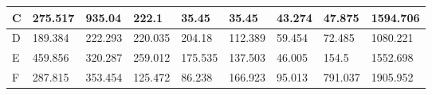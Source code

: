 \begin{landscape}
\begin{longtable}[c]{|l|llllllll|}
    C                                                                               & \multicolumn{1}{l|}{275.517}                                                        & \multicolumn{1}{l|}{935.04}                                                         & \multicolumn{1}{l|}{222.1}                                                          & \multicolumn{1}{l|}{35.45}                                                          & \multicolumn{1}{l|}{35.45}                                     & \multicolumn{1}{l|}{43.274}                                    & \multicolumn{1}{l|}{47.875}                                        & 1594.706                                                                               \\ \hline
    D                                                                               & \multicolumn{1}{l|}{189.384}                                                        & \multicolumn{1}{l|}{222.293}                                                        & \multicolumn{1}{l|}{220.035}                                                        & \multicolumn{1}{l|}{204.18}                                                         & \multicolumn{1}{l|}{112.389}                                   & \multicolumn{1}{l|}{59.454}                                    & \multicolumn{1}{l|}{72.485}                                        & 1080.221                                                                               \\ \hline
    E                                                                               & \multicolumn{1}{l|}{459.856}                                                        & \multicolumn{1}{l|}{320.287}                                                        & \multicolumn{1}{l|}{259.012}                                                        & \multicolumn{1}{l|}{175.535}                                                        & \multicolumn{1}{l|}{137.503}                                   & \multicolumn{1}{l|}{46.005}                                    & \multicolumn{1}{l|}{154.5}                                         & 1552.698                                                                               \\ \hline
    F                                                                               & \multicolumn{1}{l|}{287.815}                                                        & \multicolumn{1}{l|}{353.454}                                                        & \multicolumn{1}{l|}{125.472}                                                        & \multicolumn{1}{l|}{86.238}                                                         & \multicolumn{1}{l|}{166.923}                                   & \multicolumn{1}{l|}{95.013}                                    & \multicolumn{1}{l|}{791.037}                                       & 1905.952                                                                               \\ \hline

\end{longtable}
\end{landscape}
